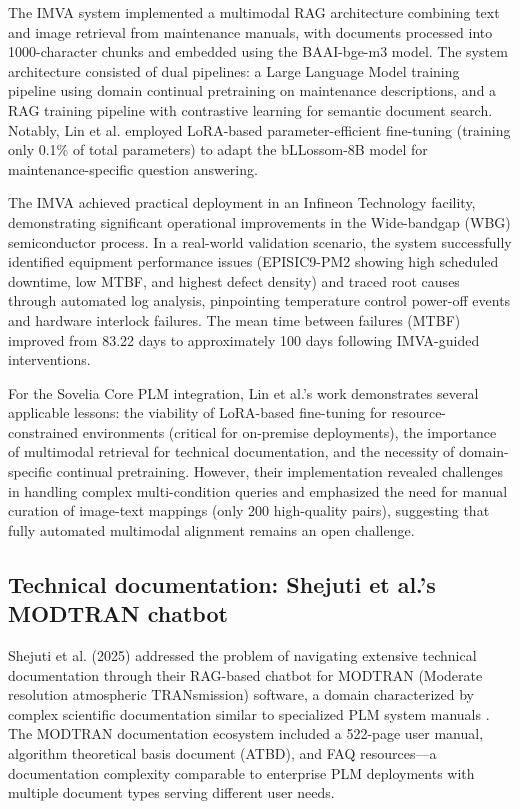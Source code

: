 The IMVA system implemented a multimodal RAG architecture combining text and image retrieval from maintenance manuals, with documents processed into 1000-character chunks and embedded using the BAAI-bge-m3 model. The system architecture consisted of dual pipelines: a Large Language Model training pipeline using domain continual pretraining on maintenance descriptions, and a RAG training pipeline with contrastive learning for semantic document search. Notably, Lin et al. employed LoRA-based parameter-efficient fine-tuning (training only 0.1\% of total parameters) to adapt the bLLossom-8B model for maintenance-specific question answering.

The IMVA achieved practical deployment in an Infineon Technology facility, demonstrating significant operational improvements in the Wide-bandgap (WBG) semiconductor process. In a real-world validation scenario, the system successfully identified equipment performance issues (EPISIC9-PM2 showing high scheduled downtime, low MTBF, and highest defect density) and traced root causes through automated log analysis, pinpointing temperature control power-off events and hardware interlock failures. The mean time between failures (MTBF) improved from 83.22 days to approximately 100 days following IMVA-guided interventions.

For the Sovelia Core PLM integration, Lin et al.'s work demonstrates several applicable lessons: the viability of LoRA-based fine-tuning for resource-constrained environments (critical for on-premise deployments), the importance of multimodal retrieval for technical documentation, and the necessity of domain-specific continual pretraining. However, their implementation revealed challenges in handling complex multi-condition queries and emphasized the need for manual curation of image-text mappings (only 200 high-quality pairs), suggesting that fully automated multimodal alignment remains an open challenge.

\subsection{Technical documentation: Shejuti et al.'s MODTRAN chatbot}

Shejuti et al. (2025) addressed the problem of navigating extensive technical documentation through their RAG-based chatbot for MODTRAN (Moderate resolution atmospheric TRANsmission) software, a domain characterized by complex scientific documentation similar to specialized PLM system manuals \parencite{shejuti_extended_2025}. The MODTRAN documentation ecosystem included a 522-page user manual, algorithm theoretical basis document (ATBD), and FAQ resources—a documentation complexity comparable to enterprise PLM deployments with multiple document types serving different user needs.

